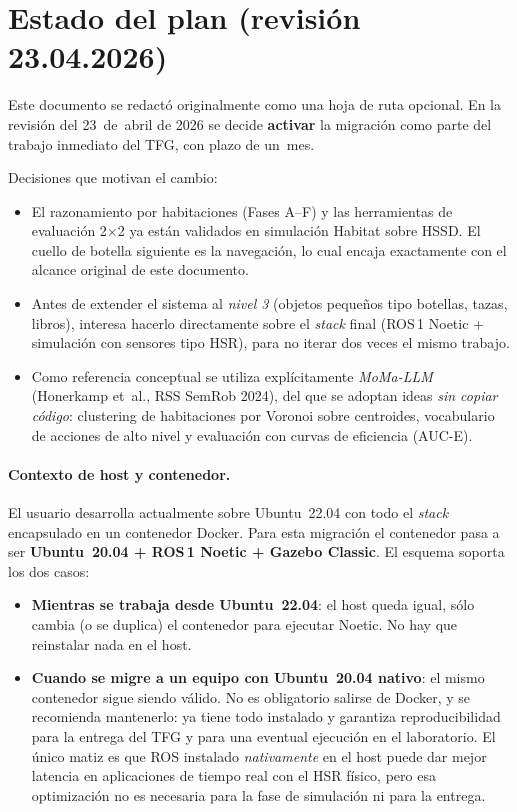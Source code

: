 \documentclass[11pt,a4paper]{article}
\begin{document}
\tableofcontents
\newpage

\section*{Estado del plan (revisión 23.04.2026)}

Este documento se redactó originalmente como una hoja de ruta opcional. En la
revisión del 23~de~abril de 2026 se decide \textbf{activar} la migración como
parte del trabajo inmediato del TFG, con plazo de un~mes.

Decisiones que motivan el cambio:

\begin{itemize}
  \item El razonamiento por habitaciones (Fases A--F) y las herramientas de
        evaluación 2$\times$2 ya están validados en simulación Habitat sobre
        HSSD. El cuello de botella siguiente es la navegación, lo cual encaja
        exactamente con el alcance original de este documento.
  \item Antes de extender el sistema al \emph{nivel 3} (objetos pequeños tipo
        botellas, tazas, libros), interesa hacerlo directamente sobre el
        \emph{stack} final (ROS\,1 Noetic + simulación con sensores tipo HSR),
        para no iterar dos veces el mismo trabajo.
  \item Como referencia conceptual se utiliza explícitamente
        \emph{MoMa-LLM} (Honerkamp et~al., RSS SemRob 2024), del que se
        adoptan ideas \emph{sin copiar código}: clustering de habitaciones por
        Voronoi sobre centroides, vocabulario de acciones de alto nivel y
        evaluación con curvas de eficiencia (AUC-E).
\end{itemize}

\paragraph{Contexto de host y contenedor.} El usuario desarrolla actualmente
sobre Ubuntu~22.04 con todo el \emph{stack} encapsulado en un contenedor
Docker. Para esta migración el contenedor pasa a ser
\textbf{Ubuntu~20.04 + ROS\,1 Noetic + Gazebo Classic}. El esquema soporta los
dos casos:

\begin{itemize}
  \item \textbf{Mientras se trabaja desde Ubuntu~22.04}: el host queda igual,
        sólo cambia (o se duplica) el contenedor para ejecutar Noetic. No hay
        que reinstalar nada en el host.
  \item \textbf{Cuando se migre a un equipo con Ubuntu~20.04 nativo}:
        el mismo contenedor sigue siendo válido. No es obligatorio salirse de
        Docker, y se recomienda mantenerlo: ya tiene todo instalado y
        garantiza reproducibilidad para la entrega del TFG y para una eventual
        ejecución en el laboratorio. El único matiz es que ROS instalado
        \emph{nativamente} en el host puede dar mejor latencia en aplicaciones
        de tiempo real con el HSR físico, pero esa optimización no es necesaria
        para la fase de simulación ni para la entrega.
\end{itemize}
\end{document}
